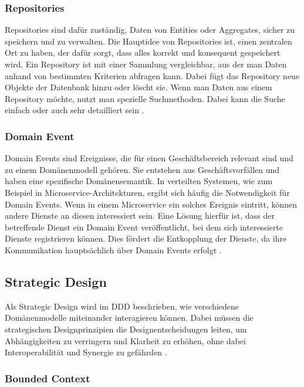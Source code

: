 {\subsubsection{Repositories}

\glqq Repositories\grqq{} sind dafür zuständig, Daten von Entities oder Aggregates, sicher zu speichern und zu verwalten. Die Hauptidee von Repositories ist, einen zentralen Ort zu haben, der dafür sorgt, dass alles korrekt und konsequent gespeichert wird. Ein Repository ist mit einer Sammlung vergleichbar, aus der man Daten anhand von bestimmten Kriterien abfragen kann. Dabei fügt das Repository neue Objekte der Datenbank hinzu oder löscht sie. Wenn man Daten aus einem Repository möchte, nutzt man spezielle Suchmethoden. Dabei kann die Suche einfach oder auch sehr detailliert sein \cite[S. 147 - 161]{evans} \cite[S.76]{daschner}.

\subsubsection{Domain Event}

\glqq Domain Events\grqq{} sind Ereignisse, die für einen Geschäftsbereich relevant sind und zu einem Domänenmodell gehören. Sie entstehen aus Geschäftsvorfällen und haben eine spezifische Domänensemantik. In verteilten Systemen, wie zum Beispiel in Microservice-Architekturen, ergibt sich häufig die Notwendigkeit für Domain Events. Wenn in einem Microservice ein solches Ereignis eintritt, können andere Dienste an diesen interessiert sein. Eine Lösung hierfür ist, dass der betreffende Dienst ein Domain Event veröffentlicht, bei dem sich interessierte Dienste registrieren können. Dies fördert die Entkopplung der Dienste, da ihre Kommunikation hauptsächlich über Domain Events erfolgt \cite[S.78]{daschner} \cite{ritter}.

\pagebreak 
\subsection{Strategic Design}

Als \glqq Strategic Design\grqq{} wird im DDD beschrieben, wie verschiedene Domänenmodelle miteinander interagieren können. Dabei müssen die strategischen Designprinzipien die Designentscheidungen leiten, um Abhängigkeiten zu verringern und Klarheit zu erhöhen, ohne dabei Interoperabilität und Synergie zu gefährden \cite[S. 45]{wolff} \cite[S. 334]{evans}.

\subsubsection{Bounded Context}

}
